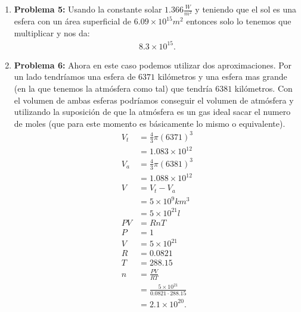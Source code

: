 \documentclass[12pt]{exam}
\begin{document}
\begin{enumerate}
  \item \textbf{Problema 5:} Usando la constante solar $1.366 \frac{W}{m^2}$ y teniendo que el sol es una esfera con un área superficial de $6.09\times 10^{15}m^{2}$ entonces solo lo tenemos que multiplicar y nos da:
    \begin{align*}
      8.3 \times 10^{15}
    .\end{align*}
  \item \textbf{Problema 6:} Ahora en este caso podemos utilizar dos aproximaciones. Por un lado tendríamos una esfera de $6371$ kilómetros y una esfera mas grande (en la que tenemos la atmósfera como tal) que tendría $6381$ kilómetros. Con el volumen de ambas esferas podríamos conseguir el volumen de atmósfera y utilizando la suposición de que la atmósfera es un gas ideal sacar el numero de moles (que para este momento es básicamente lo mismo o equivalente).
    \begin{align*}
      V_{t} &= \frac{4}{3}\pi\left( 6371 \right)^{3}\\
      &= 1.083 \times 10^{12} \\
      V_a &= \frac{4}{3}\pi\left( 6381 \right)^{3}  \\
      &= 1.088 \times 10^{12} \\
      V &= V_t - V_a \\
      &= 5\times 10^{9} km^{3} \\
      &= 5\times 10^{21} l \\
      PV &= RnT\\
      P &= 1 \\
      V &= 5\times 10^{21} \\
      R &= 0.0821 \\
      T &= 288.15 \\
      n &= \frac{PV}{RT} \\
      &= \frac{5\times 10^{21}}{0.0821 \cdot 288.15} \\
      &= 2.1 \times 10^{20}
    .\end{align*}


\end{enumerate}
\end{document}
